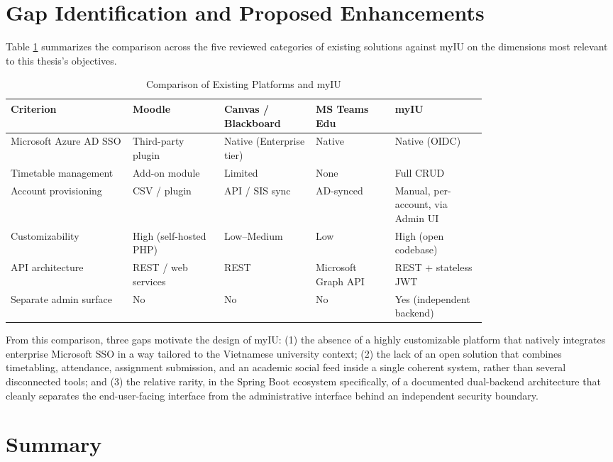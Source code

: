 \documentclass[12pt,a4paper]{report}
\begin{document}
\section{Gap Identification and Proposed Enhancements}

Table \ref{tab:lit-comparison} summarizes the comparison across the
five reviewed categories of existing solutions against myIU on the
dimensions most relevant to this thesis's objectives.

\begin{longtable}{@{}p{0.20\linewidth}p{0.15\linewidth}p{0.15\linewidth}p{0.13\linewidth}p{0.15\linewidth}@{}}
\caption{Comparison of Existing Platforms and myIU}
\label{tab:lit-comparison}\\
\toprule
\textbf{Criterion} & \textbf{Moodle} & \textbf{Canvas / Blackboard} & \textbf{MS Teams Edu} & \textbf{myIU} \\
\midrule
\endhead
Microsoft Azure AD SSO & Third-party plugin & Native (Enterprise tier) & Native & Native (OIDC) \\
Timetable management & Add-on module & Limited & None & Full CRUD \\
Account provisioning & CSV / plugin & API / SIS sync & AD-synced & Manual, per-account, via Admin UI \\
Customizability & High (self-hosted PHP) & Low--Medium & Low & High (open codebase) \\
API architecture & REST / web services & REST & Microsoft Graph API & REST + stateless JWT \\
Separate admin surface & No & No & No & Yes (independent backend) \\
\bottomrule
\end{longtable}

From this comparison, three gaps motivate the design of myIU: (1) the
absence of a highly customizable platform that natively integrates
enterprise Microsoft SSO in a way tailored to the Vietnamese university
context; (2) the lack of an open solution that combines timetabling,
attendance, assignment submission, and an academic social feed inside a
single coherent system, rather than several disconnected tools; and (3)
the relative rarity, in the Spring Boot ecosystem specifically, of a
documented dual-backend architecture that cleanly separates the
end-user-facing interface from the administrative interface behind an
independent security boundary.

\section{Summary}
\end{document}
